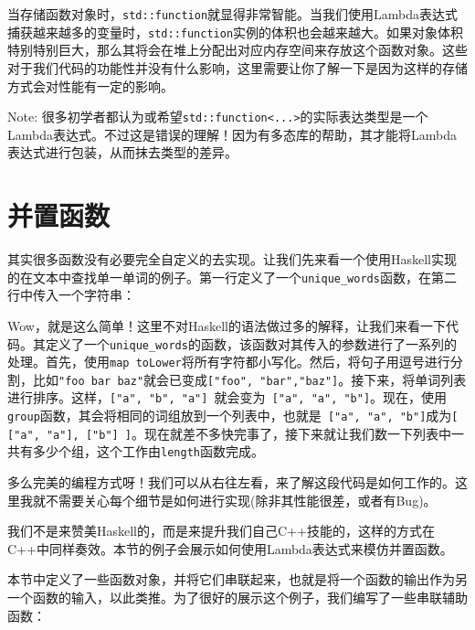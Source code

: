 当存储函数对象时，\texttt{std::function}就显得非常智能。当我们使用Lambda表达式捕获越来越多的变量时，\texttt{std::function}实例的体积也会越来越大。如果对象体积特别特别巨大，那么其将会在堆上分配出对应内存空间来存放这个函数对象。这些对于我们代码的功能性并没有什么影响，这里需要让你了解一下是因为这样的存储方式会对性能有一定的影响。

\begin{myInfoBox}
Note: 很多初学者都认为或希望\texttt{std::function<...>}的实际表达类型是一个Lambda表达式。不过这是错误的理解！因为有多态库的帮助，其才能将Lambda表达式进行包装，从而抹去类型的差异。
\end{myInfoBox}


\section{并置函数}

其实很多函数没有必要完全自定义的去实现。让我们先来看一个使用Haskell实现的在文本中查找单一单词的例子。第一行定义了一个\texttt{unique\_words}函数，在第二行中传入一个字符串：


Wow，就是这么简单！这里不对Haskell的语法做过多的解释，让我们来看一下代码。其定义了一个\texttt{unique\_words}的函数，该函数对其传入的参数进行了一系列的处理。首先，使用\texttt{map toLower}将所有字符都小写化。然后，将句子用逗号进行分割，比如\texttt{"foo bar baz"}就会已变成\texttt{["foo", "bar","baz"]}。接下来，将单词列表进行排序。这样，\texttt{["a", "b", "a"] }就会变为\texttt{ ["a", "a", "b"]}。现在，使用\texttt{group}函数，其会将相同的词组放到一个列表中，也就是\texttt{ ["a", "a", "b"]}成为\texttt{[ ["a", "a"], ["b"] ]}。现在就差不多快完事了，接下来就让我们数一下列表中一共有多少个组，这个工作由\texttt{length}函数完成。

多么完美的编程方式呀！我们可以从右往左看，来了解这段代码是如何工作的。这里我就不需要关心每个细节是如何进行实现(除非其性能很差，或者有Bug)。

我们不是来赞美Haskell的，而是来提升我们自己C++技能的，这样的方式在C++中同样奏效。本节的例子会展示如何使用Lambda表达式来模仿并置函数。


本节中定义了一些函数对象，并将它们串联起来，也就是将一个函数的输出作为另一个函数的输入，以此类推。为了很好的展示这个例子，我们编写了一些串联辅助函数：

